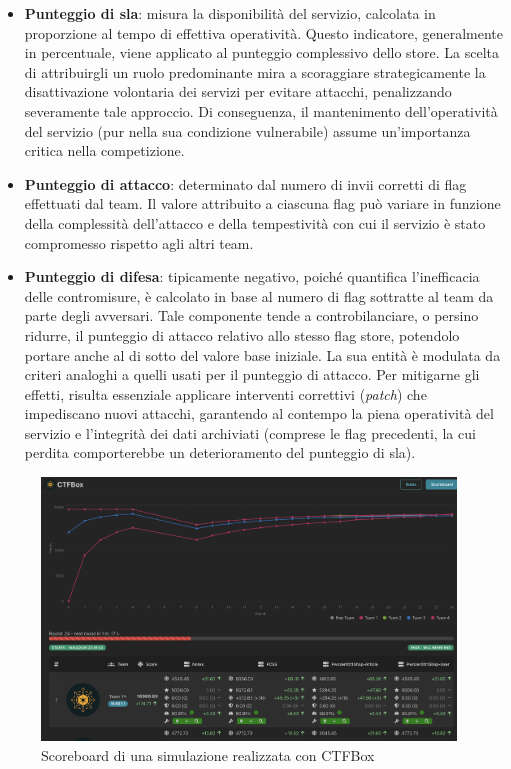 \begin{itemize}
    \setlength{\itemsep}{2pt}
    \setlength{\parskip}{2pt}
    \item \textbf{Punteggio di \gls{sla}}: misura la disponibilità del servizio, calcolata in proporzione al tempo di effettiva operatività.
    Questo indicatore, generalmente in percentuale, viene applicato al punteggio complessivo dello store. La scelta di attribuirgli un ruolo predominante mira a scoraggiare strategicamente la disattivazione volontaria dei servizi per evitare attacchi, penalizzando severamente tale approccio. Di conseguenza, il mantenimento dell’operatività del servizio (pur nella sua condizione vulnerabile) assume un’importanza critica nella competizione.
    \item \textbf{Punteggio di attacco}: determinato dal numero di invii corretti di flag effettuati dal team. Il valore attribuito a ciascuna flag può variare in funzione della complessità dell’attacco e della tempestività con cui il servizio è stato compromesso rispetto agli altri team.
    \item \textbf{Punteggio di difesa}: tipicamente negativo, poiché quantifica l’inefficacia delle contromisure, è calcolato in base al numero di flag sottratte al team da parte degli avversari. Tale componente tende a controbilanciare, o persino ridurre, il punteggio di attacco relativo allo stesso flag store, potendolo portare anche al di sotto del valore base iniziale. La sua entità è modulata da criteri analoghi a quelli usati per il punteggio di attacco. Per mitigarne gli effetti, risulta essenziale applicare interventi correttivi (\emph{patch}) che impediscano nuovi attacchi, garantendo al contempo la piena operatività del servizio e l’integrità dei dati archiviati (comprese le flag precedenti, la cui perdita comporterebbe un deterioramento del punteggio di \gls{sla}).
\end{itemize}

\begin{figure}[H]
    \centering
    \includegraphics[width=0.98\textwidth]{images/chapter1/ctfbox_scoreboard.png}
    \caption{Scoreboard di una simulazione realizzata con CTFBox}\label{fig:ctfbox_scoreboard}
\end{figure}

